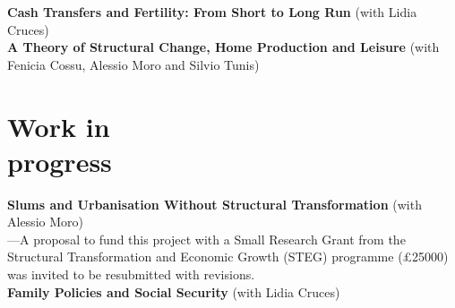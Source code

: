 \documentclass[margin]{res} %
\begin{document}
\begin{resume}
{\bf Cash Transfers and Fertility: From Short to Long Run} (with Lidia Cruces) \\



{\bf A Theory of Structural Change, Home Production and Leisure} (with Fenicia Cossu, Alessio Moro and Silvio Tunis) 

\section{Work in \\ progress}
{\bf Slums and Urbanisation Without Structural Transformation} (with Alessio Moro) \\
---A proposal to fund this project with a Small Research Grant from the Structural Transformation and Economic Growth (STEG) programme (£25000) was invited to be resubmitted with revisions. \\
{\bf Family Policies and Social Security} (with Lidia Cruces)


\end{resume}
\end{document}
